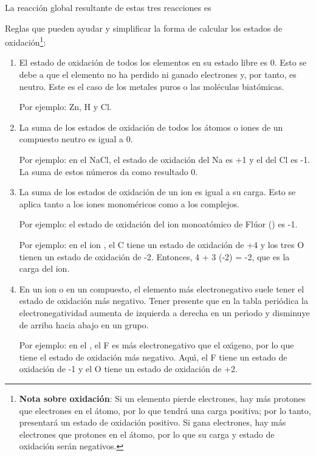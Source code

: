 La reacci\'on global resultante de estas tres reacciones es


Reglas que pueden ayudar y simplificar la forma de calcular los estados de oxidaci\'on\footnote{\textbf{Nota sobre oxidaci\'on}: Si un elemento pierde electrones, hay m\'as protones que electrones en el \'atomo, por lo que tendr\'a una carga positiva; por lo tanto, presentar\'a un estado de oxidaci\'on positivo. Si gana electrones, hay m\'as electrones que protones en el \'atomo, por lo que su carga y estado de oxidaci\'on ser\'an negativos.}:
\begin{enumerate}
\item El estado de oxidaci\'on de todos los elementos en su estado libre es 0. Esto se debe a que el elemento no ha perdido ni ganado electrones y, por tanto, es neutro. Este es el caso de los metales puros o las mol\'eculas biat\'omicas.

Por ejemplo: Zn, H y Cl.
\item La suma de los estados de oxidaci\'on de todos los \'atomos o iones de un compuesto neutro es igual a 0.

Por ejemplo: en el NaCl, el estado de oxidaci\'on del Na es +1 y el del Cl es -1. La suma de estos n\'umeros da como resultado 0.
\item La suma de los estados de oxidaci\'on de un ion es igual a su carga. Esto se aplica tanto a los iones monom\'ericos como a los complejos.

Por ejemplo: el estado de oxidaci\'on del ion monoat\'omico de Fl\'uor () es -1.

Por ejemplo: en el ion , el C tiene un estado de oxidaci\'on de +4 y los tres O tienen un estado de oxidaci\'on de -2. Entonces, 4 + 3 (-2) = -2, que es la carga del ion.
\item En un ion o en un compuesto, el elemento m\'as electronegativo suele tener el estado de oxidaci\'on m\'as negativo. Tener presente que en la tabla peri\'odica la electronegatividad aumenta de izquierda a derecha en un per\'{\i}odo y disminuye de arriba hacia abajo en un grupo.

Por ejemplo: en el , el F es m\'as electronegativo que el ox\'{\i}geno, por lo que tiene el estado de oxidaci\'on m\'as negativo. Aqu\'{\i}, el F tiene un estado de oxidaci\'on de -1 y el O tiene un estado de oxidaci\'on de +2.
\end{enumerate}

